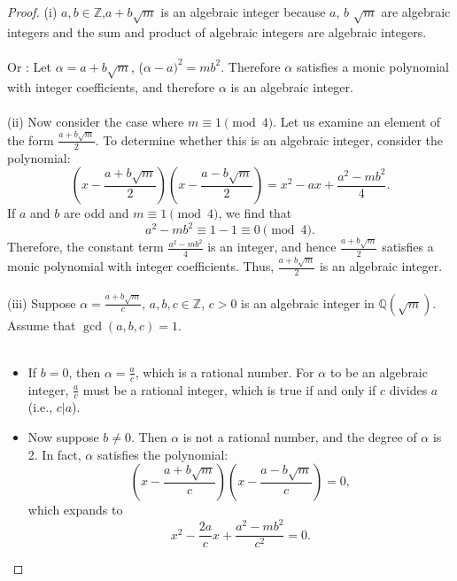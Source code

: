 \documentclass{article}
\begin{document}
\begin{proof}
(i) $a, b \in \mathbb{Z}$,$a + b\sqrt{m}$ is an algebraic integer because $a$, $b$ 
$\sqrt{m}$ are algebraic integers and the sum and product of algebraic integers are algebraic integers.\\\\

Or : Let $\alpha =  a + b\sqrt{m}$,  ($\alpha - a)^2 = m b^2$.
Therefore $\alpha$ satisfies a monic polynomial with integer coefficients, and therefore 
$\alpha$ is an algebraic integer.\\\\

(ii) Now consider the case where \( m \equiv 1 \pmod{4} \). Let us examine an element of the form \( \frac{a + b\sqrt{m}}{2} \). To determine whether this is an algebraic integer, consider the polynomial:
\[
\left( x - \frac{a + b\sqrt{m}}{2} \right) \left( x - \frac{a - b\sqrt{m}}{2} \right) = x^2 - ax + \frac{a^2 - m b^2}{4}.
\]
If \( a \) and \( b \) are odd and \( m \equiv 1 \pmod{4} \), we find that
\[
a^2 - m b^2 \equiv 1 - 1 \equiv 0 \pmod{4}.
\]
Therefore, the constant term \( \frac{a^2 - m b^2}{4} \) is an integer, and hence \( \frac{a + b\sqrt{m}}{2} \) satisfies a monic polynomial with integer coefficients. Thus, \( \frac{a + b\sqrt{m}}{2} \) is an algebraic integer.\\\\
(iii) Suppose $\alpha = \frac{a + b\sqrt{m}}{c}$, $a, b, c \in \mathbb{Z}$, $c > 0$ is an algebraic integer in $\mathbb{Q}(\sqrt{m})$. 
 Assume that $\gcd(a, b, c) = 1$. \\\\

\begin{itemize}
    \item If \( b = 0 \), then \( \alpha = \frac{a}{c} \), which is a rational number. For \( \alpha \) to be an algebraic integer, \( \frac{a}{c} \) must be a rational integer, which is true if and only if \( c \) divides \( a \) (i.e., \( c | a \)).

    \item Now suppose \( b \neq 0 \). Then \( \alpha \) is not a rational number, and the degree of \( \alpha \) is 2. In fact, \( \alpha \) satisfies the polynomial:
    \[
    \left(x - \frac{a + b\sqrt{m}}{c}\right)\left(x - \frac{a - b\sqrt{m}}{c}\right) = 0,
    \]
    which expands to
    \[
    x^2 - \frac{2a}{c} x + \frac{a^2 - m b^2}{c^2} = 0.
    \]
\end{itemize}


\end{proof}
\end{document}
